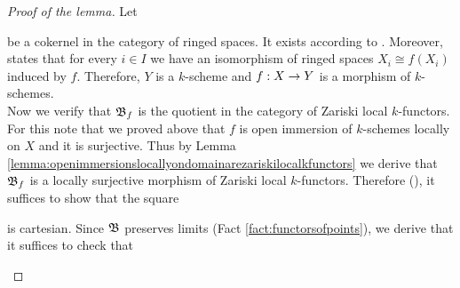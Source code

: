 \begin{proof}[Proof of the lemma]
Let
\begin{center}
\end{center}
be a cokernel in the category of ringed spaces. It exists according to {\cite[Remark 2.3]{LocallyRingedSpaces}}. Moreover, {\cite[Theorem 3.2]{LocallyRingedSpaces}} states that for every $i\in I$ we have an isomorphism of ringed spaces $X_i\cong f(X_i)$ induced by $f$. Therefore, $Y$ is a $k$-scheme and $f:X\ra Y$ is a morphism of $k$-schemes.\\
Now we verify that $\fB_f$ is the quotient in the category of Zariski local $k$-functors. For this note that we proved above that $f$ is open immersion of $k$-schemes locally on $X$ and it is surjective. Thus by Lemma \ref{lemma:openimmersionslocallyondomainarezariskilocalkfunctors} we derive that $\fB_f$ is a locally surjective morphism of Zariski local $k$-functors. Therefore ({\cite[Theorem 7.3]{Sheaves}}), it suffices to show that the square
\begin{center}
\end{center}
is cartesian. Since $\fB$ preserves limits (Fact \ref{fact:functorsofpoints}), we derive that it suffices to check that
\begin{center}
\begin{tikzpicture}
[description/.style={fill=white,inner sep=2pt}]

\end{tikzpicture}
\end{center}
\end{proof}
